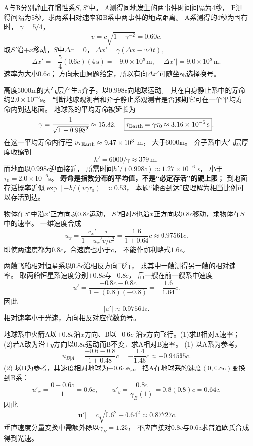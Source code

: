 \problemtext A与B分别静止在惯性系$S,S'$中。
A测得同地发生的两事件时间间隔为4秒，
B测得间隔为5秒，求两系相对速率和B系中两事件的地点距离。
\workings
A系测得的4秒为固有时，
$\gamma=5/4$，
\[
\boxed{v=c\sqrt{1-\gamma^{-2}}=0.60c}.
\]
取$S'$沿$+x$移动，$S$中$\Delta x=0$，
$\Delta x'=\gamma(\Delta x-v\Delta t)$，
\[
\boxed{\Delta x'=-\frac54(0.6c)(4\,\mathrm s)
=-9.0\times10^8\,\mathrm m},\quad
\boxed{|\Delta x'|=9.0\times10^8\,\mathrm m}.
\]
\crosscheck 速率为大小$0.6c$；
方向未由原题给定，所以有向$\Delta x'$可随坐标选择换号。

\problemtext 高度6000m的大气层产生$\pi$介子，以$0.998c$向地球运动，
其在自身静止系中的寿命约$2.0\times10^{-6}$s。
判断地球观测者和介子静止系观测者是否预期它可在一个平均寿命内到达地面。
\workings
地球系的平均寿命被延长为
\[
\gamma=\frac1{\sqrt{1-0.998^2}}\approx15.82,
\quad
\boxed{\tau_{\rm Earth}=\gamma\tau_0\approx3.16\times10^{-5}\,\mathrm s}.
\]
在这一平均寿命内行程
$v\tau_{\rm Earth}\approx9.47\times10^3$ m，
大于6000m。
介子系中大气层厚度收缩到
\[
\boxed{h'=6000/\gamma\approx379\,\mathrm m},
\]
而地面以$0.998c$迎面接近，
所需时间$h'/(0.998c)\approx1.27\times10^{-6}$ s，
小于$\tau_0=2.0\times10^{-6}$s。
\crosscheck \textbf{寿命是指数分布的平均值，不是“必定存活”的硬上限}；
到地面存活概率近似$\exp[-h/(v\gamma\tau_0)]\approx0.53$，
本题“能否到达”应理解为相当比例可以存活到达。

\problemtext 物体在$S'$中沿$x'$正方向以$0.8c$运动，
$S'$相对$S$也沿$x$正方向以$0.8c$移动，求物体在$S$中的速率。
\workings
一维速度合成
\[
\boxed{u_x=\frac{u_x'+v}{1+u_x'v/c^2}
=\frac{1.6}{1+0.64}c
\approx0.97561c}.
\]
\crosscheck 即使两速度都为$0.8c$，合速度也小于$c$，
不能作伽利略式$1.6c$。

\problemtext 两艘飞船相对恒星系以$0.8c$沿相反方向飞行，
求其中一艘测得另一艘的相对速率。
\workings
取两船恒星系速度分别$+0.8c$与$-0.8c$，
后一艘在前一艘系中速度
\[
u'=\frac{-0.8c-0.8c}{1-(0.8)(-0.8)}
=-\frac{1.6}{1.64}c.
\]
因此
\[
\boxed{|u'|\approx0.97561c}.
\]
\crosscheck 相对速率小于光速，方向相反对应代数负号。

\problemtext 地球系中火箭A以$+0.8c$沿$x$方向、B以$-0.6c$
沿$x$方向飞行。(1)求B相对A速率；
(2)若A改为沿$+y$方向以$0.8c$运动而B不变，求A相对B速率。
\workings
(1) 以A系为参考，
\[
\boxed{u_{B|A}=\frac{-0.6-0.8}{1+0.48}c
=-\frac{1.4}{1.48}c\approx-0.94595c}.
\]
(2) 以B为参考，其速度相对地球为$-0.6c\,\bm e_x$。
把A在地球系的速度$(0,0.8c)$变换到B系：
\[
u'_x=\frac{0+0.6c}{1}=0.6c,\qquad
u'_y=\frac{0.8c}{\gamma_B(1)}=0.8(0.8)c=0.64c.
\]
因此
\[
\boxed{|\bm u'|=c\sqrt{0.6^2+0.64^2}
\approx0.87727c}.
\]
\crosscheck 垂直速度分量变换中需额外除以$\gamma_B=1.25$，
不应直接对$0.8c$与$0.6c$求普通欧氏合成得到光速。
